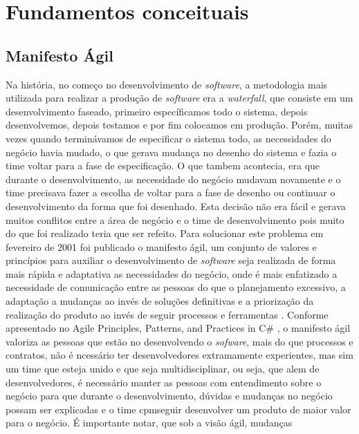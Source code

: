\part{Fundamentos conceituais}
  \chapter{Manifesto Ágil}
    Na história, no começo no desenvolvimento de \textit{software}, a metodologia
    mais utilizada para realizar a produção de \textit{software} era a \textit{waterfall},
    que consiste em um desenvolvimento faseado, primeiro específicamos todo o sistema,
    depois desenvolvemos, depois testamos e por fim colocamos em produção. Porém,
    muitas vezes quando terminávamos de especificar o sistema todo, as necessidades
    do negócio havia mudado, o que gerava mudança no desenho do sistema e fazia
    o time voltar para a fase de especificação. O que tambem acontecia, era que
    durante o desenvolvimento, as necessidade do negócio mudavam novamente e
    o time precisava fazer a escolha de voltar para a fase de desenho ou continuar
    o desenvolvimento da forma que foi desenhado. Esta decisão não era fácil e
    gerava muitos conflitos entre a área de negócio e o time de desenvolvimento
    pois muito do que foi realizado teria que ser refeito. \newline
    Para solucionar este problema em fevereiro de 2001 foi publicado o manifesto
    ágil, um conjunto de valores e princípios para auxiliar o desenvolvimento de
    \textit{software} seja realizada de forma mais rápida e adaptativa as
    necessidades do negócio, onde é mais enfatizado a necessidade de comunicação
    entre as pessoas do que o planejamento excessivo, a adaptação a mudanças ao
    invés de soluções definitivas e a priorização da realização do produto ao
    invés de seguir processos e ferramentas \cite{manifestoAgile}. \newline
    Conforme apresentado no Agile Principles, Patterns, and Practices in C\#
    \cite{martin2007agile}, o manifesto ágil valoriza as pessoas que estão
    no desenvolvendo o \textit{sofware}, mais do que processos e contratos,
    não é ncessário ter desenvolvedores extramamente experientes, mas sim
    um time que esteja unido e que seja multidisciplinar, ou seja, que alem de
    desenvolvedores, é necessário manter as pessoas com entendimento sobre o
    negócio para que durante o desenvolvimento, dúvidas e mudanças no negócio
    possam ser explicadas e o time cpmseguir desenvolver um produto de maior
    valor para o negócio. É importante notar, que sob a visão ágil, mudanças

